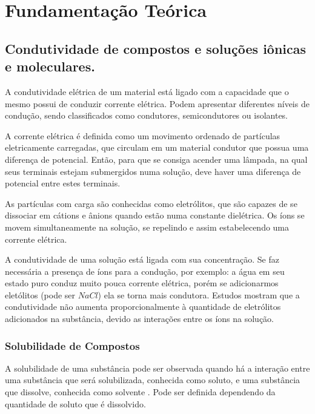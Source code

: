 \chapter{Fundamentação Teórica}


\section{Condutividade de compostos e soluções iônicas e moleculares.}\label{sub:Condutividade de compostos e soluções iônicas e moleculares.} %
A condutividade elétrica de um material está ligado com a capacidade que o mesmo possui de conduzir corrente elétrica.\cite{lab-quimica-condutividade-eletrica} Podem apresentar diferentes níveis de condução, sendo classificados como condutores, semicondutores ou isolantes.

A corrente elétrica é definida como um movimento ordenado de partículas eletricamente carregadas, que circulam em um material condutor que possua uma diferença de potencial. Então, para que se consiga acender uma lâmpada, na qual seus terminais estejam submergidos numa solução, deve haver uma diferença de potencial entre estes terminais. 

As partículas com carga são conhecidas como eletrólitos, que são capazes de se dissociar em cátions e ânions quando estão numa constante dielétrica. Os íons se movem simultaneamente na solução, se repelindo e assim estabelecendo uma corrente elétrica.

A condutividade de uma solução está ligada com sua concentração. Se faz necessária a presença de íons para a condução, por exemplo: a água em seu estado puro conduz muito pouca corrente elétrica, porém se adicionarmos eletólitos (pode ser $NaCl$) ela se torna mais condutora. Estudos mostram que a condutividade não aumenta proporcionalmente à quantidade de eletrólitos adicionados na substância, devido as interações entre os íons na solução.

\subsection{Solubilidade de Compostos}\label{sub:Condutividade de compostos e soluções iônicas e moleculares.} %

A solubilidade de uma substância pode ser observada quando há a interação entre uma substância que será solubilizada, conhecida como soluto, e uma substância que dissolve, conhecida como solvente \cite{solubilidade-substancias-organicas}. Pode ser definida dependendo da quantidade de soluto que é dissolvido. 

